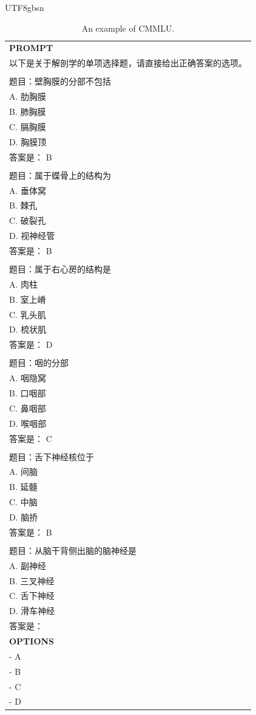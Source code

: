 \documentclass[11pt, a4paper, logo, copyright, nonumbering]{deepseek}
\begin{document}
\begin{CJK*}{UTF8}{gbsn}
\begin{table}[ht]
    \centering \small
\begin{tabular}{p{12cm}}
\toprule
\textbf{PROMPT}\\
以下是关于解剖学的单项选择题，请直接给出正确答案的选项。
\\
\\题目：壁胸膜的分部不包括
\\A. 肋胸膜
\\B. 肺胸膜
\\C. 膈胸膜
\\D. 胸膜顶
\\答案是： B
\\
\\题目：属于蝶骨上的结构为
\\A. 垂体窝
\\B. 棘孔
\\C. 破裂孔
\\D. 视神经管
\\答案是： B
\\
\\题目：属于右心房的结构是
\\A. 肉柱
\\B. 室上嵴
\\C. 乳头肌
\\D. 梳状肌
\\答案是： D
\\
\\题目：咽的分部
\\A. 咽隐窝
\\B. 口咽部
\\C. 鼻咽部
\\D. 喉咽部
\\答案是： C
\\
\\题目：舌下神经核位于
\\A. 间脑
\\B. 延髓
\\C. 中脑
\\D. 脑挢
\\答案是： B
\\
\\题目：从脑干背侧出脑的脑神经是
\\A. 副神经
\\B. 三叉神经
\\C. 舌下神经
\\D. 滑车神经
\\答案是：\\
\midrule
\textbf{OPTIONS}\\
- A\\
- B\\
- C\\
- D\\
\bottomrule
\end{tabular}
    \caption{\centering An example of CMMLU.}
    \label{tab:cmmlu_eval_format_example}
\end{table}


\end{CJK*}
\end{document}
